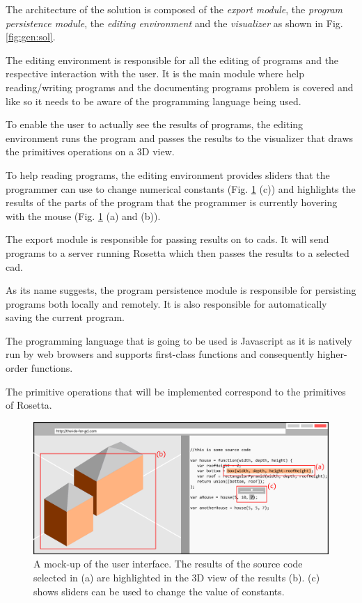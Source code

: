 \documentclass{./llncs2e/llncs}
\begin{document}
	The architecture of the solution is composed of the \emph{export module}, the \emph{program persistence module}, the \emph{editing environment} and the \emph{visualizer} as shown in Fig. \ref{fig:gen:sol}.
	
	The editing environment is responsible for all the editing of programs and the respective interaction with the user.
	It is the main module where help reading/writing programs and the documenting programs problem is covered and like so it needs to be aware of the programming language being used.
	
	To enable the user to actually see the results of programs, the editing environment runs the program and passes the results to the visualizer that draws the primitives operations on a 3D view.
	
	To help reading programs, the editing environment provides sliders that the programmer can use to change numerical constants (Fig. \ref{fig:ui:mock} (c)) and highlights the results of the parts of the program that the programmer is currently hovering with the mouse (Fig. \ref{fig:ui:mock} (a) and (b)).
	
	The export module is responsible for passing results on to \acp{cad}.
	It will send programs to a server running Rosetta which then passes the results to a selected \ac{cad}.
	
	As its name suggests, the program persistence module is responsible for persisting programs both locally and remotely.
	It is also responsible for automatically saving the current program.
	
	The programming language that is going to be used is Javascript as it is natively run by web browsers and supports first-class functions and consequently higher-order functions.
	
	The primitive operations that will be implemented correspond to the primitives of Rosetta.	
	
	\begin{figure}
		\centering
		\includegraphics[width=1.0\textwidth]{img/ui_mock}
		\caption{A mock-up of the user interface. The results of the source code selected in (a) are highlighted in the 3D view of the results (b). (c) shows sliders can be used to change the value of constants.}
		\label{fig:ui:mock}
	\end{figure}
	
\end{document}
